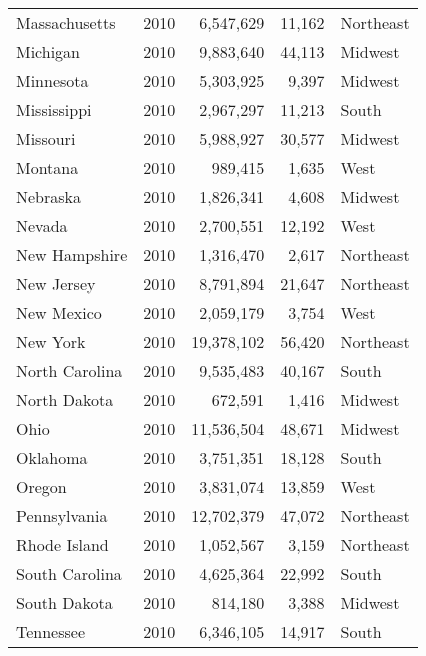 \documentclass{exam}
\begin{document}
\begin{tabular}{lrrrl}
      Massachusetts  & 2010 & 6,547,629        & 11,162            & Northeast \\
      Michigan       & 2010 & 9,883,640        & 44,113            & Midwest \\
      Minnesota      & 2010 & 5,303,925        & 9,397             & Midwest \\
      Mississippi    & 2010 & 2,967,297        & 11,213            & South \\
      Missouri       & 2010 & 5,988,927        & 30,577            & Midwest \\
      Montana        & 2010 & 989,415          & 1,635             & West \\
      Nebraska       & 2010 & 1,826,341        & 4,608             & Midwest \\
      Nevada         & 2010 & 2,700,551        & 12,192            & West \\
      New Hampshire  & 2010 & 1,316,470        & 2,617             & Northeast \\
      New Jersey     & 2010 & 8,791,894        & 21,647            & Northeast \\
      New Mexico     & 2010 & 2,059,179        & 3,754             & West \\
      New York       & 2010 & 19,378,102       & 56,420            & Northeast \\
      North Carolina & 2010 & 9,535,483        & 40,167            & South \\
      North Dakota   & 2010 & 672,591          & 1,416             & Midwest \\
      Ohio           & 2010 & 11,536,504       & 48,671            & Midwest \\
      Oklahoma       & 2010 & 3,751,351        & 18,128            & South \\
      Oregon         & 2010 & 3,831,074        & 13,859            & West \\
      Pennsylvania   & 2010 & 12,702,379       & 47,072            & Northeast \\
      Rhode Island   & 2010 & 1,052,567        & 3,159             & Northeast \\
      South Carolina & 2010 & 4,625,364        & 22,992            & South \\
      South Dakota   & 2010 & 814,180          & 3,388             & Midwest \\
      Tennessee      & 2010 & 6,346,105        & 14,917            & South \\

\end{tabular}
\end{document}
